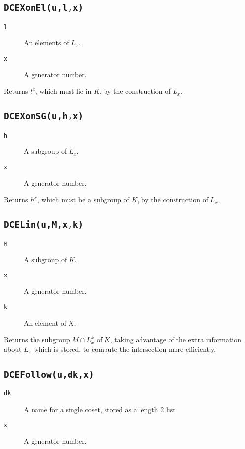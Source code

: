 \subsection{\tt DCEXonEl(u,l,x)}
\begin{description}
\item[\tt l] An elements of $L_x$.
\item[\tt x] A generator number.
\end{description}

Returns $l^x$, which must lie in $K$, by the construction of $L_x$.

\subsection{\tt DCEXonSG(u,h,x)}

\begin{description}
\item[\tt h] A subgroup of $L_x$.
\item[\tt x] A generator number.
\end{description}

Returns $h^x$, which must be a subgroup of $K$, by the construction of
$L_x$.

\subsection{\tt DCELin(u,M,x,k)}
\begin{description}
\item[\tt M] A subgroup of $K$.
\item[\tt x] A generator number.
\item[\tt k] An element of $K$.
\end{description}

Returns the subgroup $M\cap L_x^k$ of $K$, taking advantage of the
extra information about $L_x$ which is stored, to compute the
intersection more efficiently.

\subsection{\tt DCEFollow(u,dk,x)}

\begin{description}
\item[\tt dk] A name for a single coset, stored as a length 2 list.
\item[\tt x] A generator number.
\end{description}

